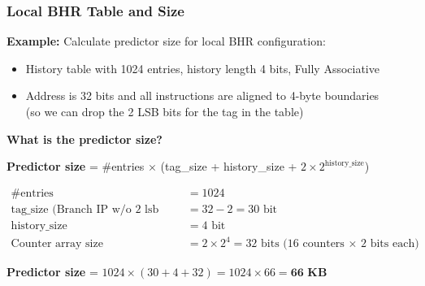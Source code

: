 \documentclass[aspectratio=169,12pt]{beamer}
\begin{document}
\begin{frame}
  \frametitle{Local BHR Table and Size}

  \textbf{Example:} Calculate predictor size for local BHR configuration:

  \vspace{0.5em}
  \begin{itemize}
    \item History table with 1024 entries, history length 4 bits, Fully Associative
    \item Address is 32 bits and all instructions are aligned to 4-byte boundaries\\
          (so we can drop the 2 LSB bits for the tag in the table)
  \end{itemize}

  \vspace{0.8em}
  \textbf{What is the predictor size?}

  \vspace{0.5em}
  \begin{tcolorbox}[colback=blue!10, colframe=blue!50, title=Formula]
    \small
    \textbf{Predictor size} = \#entries $\times$ (tag\_size + history\_size + $2 \times 2^{\text{history\_size}}$)
  \end{tcolorbox}

  \vspace{0.5em}
  \begin{align*}
    \text{\#entries} &= 1024 \\
    \text{tag\_size (Branch IP w/o 2 lsb bits)} &= 32 - 2 = 30 \text{ bit} \\
    \text{history\_size} &= 4 \text{ bit} \\
    \text{Counter array size} &= 2 \times 2^4 = 32 \text{ bits (16 counters × 2 bits each)}
  \end{align*}

  \vspace{0.3em}
  \begin{tcolorbox}[colback=green!10, colframe=green!50]
    \centering
    \textbf{Predictor size} = $1024 \times (30 + 4 + 32) = 1024 \times 66 = \textbf{66 KB}$
  \end{tcolorbox}
\end{frame}
\end{document}
